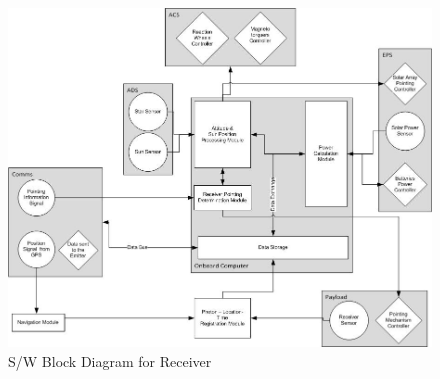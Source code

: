 \begin{landscape}
\begin{figure}[ht!]
\centering
\includegraphics[width=1\textheight]{chapters/img/SWBDrec.jpg}
\caption{S/W Block Diagram for Receiver}
\label{fig:SWBDrec}
\end{figure}
\end{landscape}